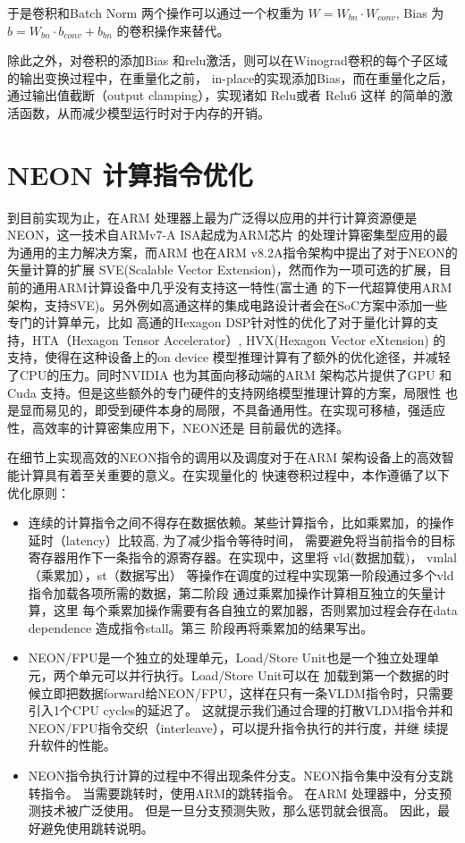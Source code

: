 于是卷积和Batch Norm 两个操作可以通过一个权重为 $W = W_{bn} \cdot W_{conv}$, Bias 为 $b = W_{bn} \cdot b_{conv} + b_{bn}$
的卷积操作来替代。

除此之外，对卷积的添加Bias 和relu激活，则可以在Winograd卷积的每个子区域的输出变换过程中，在重量化之前，
in-place的实现添加Bias，而在重量化之后，通过输出值截断（output clamping），实现诸如 Relu或者 Relu6 这样
的简单的激活函数，从而减少模型运行时对于内存的开销。

\section{NEON 计算指令优化}

到目前实现为止，在ARM 处理器上最为广泛得以应用的并行计算资源便是NEON，这一技术自ARMv7-A ISA起成为ARM芯片
的处理计算密集型应用的最为通用的主力解决方案，而ARM 也在ARM v8.2A指令架构中提出了对于NEON的矢量计算的扩展
SVE(Scalable Vector Extension)，然而作为一项可选的扩展，目前的通用ARM计算设备中几乎没有支持这一特性(富士通
的下一代超算使用ARM架构，支持SVE)。另外例如高通这样的集成电路设计者会在SoC方案中添加一些专门的计算单元，比如
高通的Hexagon DSP针对性的优化了对于量化计算的支持，HTA（Hexagon Tensor Accelerator）, HVX(Hexagon Vector 
eXtension) 的支持，使得在这种设备上的on device 模型推理计算有了额外的优化途径，并减轻了CPU的压力。同时NVIDIA
也为其面向移动端的ARM 架构芯片提供了GPU 和Cuda 支持。但是这些额外的专门硬件的支持网络模型推理计算的方案，局限性
也是显而易见的，即受到硬件本身的局限，不具备通用性。在实现可移植，强适应性，高效率的计算密集应用下，NEON还是
目前最优的选择。

在细节上实现高效的NEON指令的调用以及调度对于在ARM 架构设备上的高效智能计算具有着至关重要的意义。在实现量化的
快速卷积过程中，本作遵循了以下优化原则：

\begin{itemize}
    \item 连续的计算指令之间不得存在数据依赖。某些计算指令，比如乘累加，的操作延时（latency）比较高, 为了减少指令等待时间，
    需要避免将当前指令的目标寄存器用作下一条指令的源寄存器。在实现中，这里将 vld(数据加载)， vmlal（乘累加），st（数据写出）
    等操作在调度的过程中实现第一阶段通过多个vld 指令加载各项所需的数据，第二阶段 通过乘累加操作计算相互独立的矢量计算，这里
    每个乘累加操作需要有各自独立的累加器，否则累加过程会存在data dependence 造成指令stall。第三 阶段再将乘累加的结果写出。
    \item NEON/FPU是一个独立的处理单元，Load/Store Unit也是一个独立处理单元，两个单元可以并行执行。Load/Store Unit可以在
    加载到第一个数据的时候立即把数据forward给NEON/FPU，这样在只有一条VLDM指令时，只需要引入1个CPU cycles的延迟了。
    这就提示我们通过合理的打散VLDM指令并和NEON/FPU指令交织（interleave），可以提升指令执行的并行度，并继 续提升软件的性能。
    \item NEON指令执行计算的过程中不得出现条件分支。NEON指令集中没有分支跳转指令。 当需要跳转时，使用ARM的跳转指令。 在ARM
    处理器中，分支预测技术被广泛使用。 但是一旦分支预测失败，那么惩罚就会很高。 因此，最好避免使用跳转说明。
\end{itemize}

